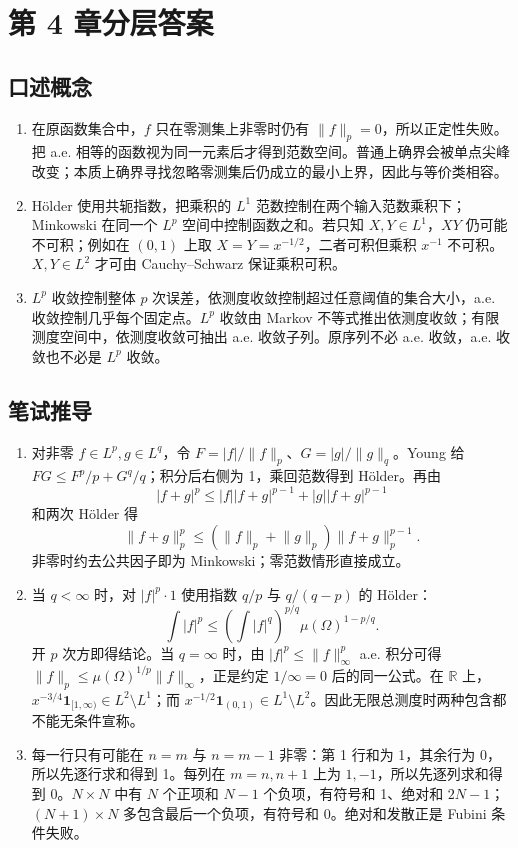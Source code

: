 \chapter{第 4 章分层答案}
\label{app:ch04-solutions}

\section*{口述概念}

\begin{enumerate}[leftmargin=*]
  \item 在原函数集合中，$f$ 只在零测集上非零时仍有 $\lVert f\rVert_p=0$，所以正定性失败。把 a.e. 相等的函数视为同一元素后才得到范数空间。普通上确界会被单点尖峰改变；本质上确界寻找忽略零测集后仍成立的最小上界，因此与等价类相容。
  \item Hölder 使用共轭指数，把乘积的 $L^1$ 范数控制在两个输入范数乘积下；Minkowski 在同一个 $L^p$ 空间中控制函数之和。若只知 $X,Y\in L^1$，$XY$ 仍可能不可积；例如在 $(0,1)$ 上取 $X=Y=x^{-1/2}$，二者可积但乘积 $x^{-1}$ 不可积。$X,Y\in L^2$ 才可由 Cauchy--Schwarz 保证乘积可积。
  \item $L^p$ 收敛控制整体 $p$ 次误差，依测度收敛控制超过任意阈值的集合大小，a.e. 收敛控制几乎每个固定点。$L^p$ 收敛由 Markov 不等式推出依测度收敛；有限测度空间中，依测度收敛可抽出 a.e. 收敛子列。原序列不必 a.e. 收敛，a.e. 收敛也不必是 $L^p$ 收敛。
\end{enumerate}

\section*{笔试推导}

\begin{enumerate}[leftmargin=*]
  \item 对非零 $f\in L^p,g\in L^q$，令 $F=|f|/\lVert f\rVert_p$、$G=|g|/\lVert g\rVert_q$。Young 给 $FG\leq F^p/p+G^q/q$；积分后右侧为 1，乘回范数得到 Hölder。再由
  \[
   |f+g|^p\leq|f||f+g|^{p-1}+|g||f+g|^{p-1}
  \]
  和两次 Hölder 得
  \[
   \lVert f+g\rVert_p^p
   \leq(\lVert f\rVert_p+\lVert g\rVert_p)
        \lVert f+g\rVert_p^{p-1}.
  \]
  非零时约去公共因子即为 Minkowski；零范数情形直接成立。
  \item 当 $q<\infty$ 时，对 $|f|^p\cdot1$ 使用指数 $q/p$ 与 $q/(q-p)$ 的 Hölder：
  \[
   \int|f|^p\leq(\int|f|^q)^{p/q}\mu(\Omega)^{1-p/q}.
  \]
  开 $p$ 次方即得结论。当 $q=\infty$ 时，由 $|f|^p\leq\lVert f\rVert_\infty^p$ a.e. 积分可得 $\lVert f\rVert_p\leq\mu(\Omega)^{1/p}\lVert f\rVert_\infty$，正是约定 $1/\infty=0$ 后的同一公式。在 $\mathbb R$ 上，$x^{-3/4}\mathbf1_{[1,\infty)}\in L^2\setminus L^1$；而 $x^{-1/2}\mathbf1_{(0,1)}\in L^1\setminus L^2$。因此无限总测度时两种包含都不能无条件宣称。
  \item 每一行只有可能在 $n=m$ 与 $n=m-1$ 非零：第 1 行和为 1，其余行为 0，所以先逐行求和得到 1。每列在 $m=n,n+1$ 上为 $1,-1$，所以先逐列求和得到 0。$N\times N$ 中有 $N$ 个正项和 $N-1$ 个负项，有符号和 1、绝对和 $2N-1$；$(N+1)\times N$ 多包含最后一个负项，有符号和 0。绝对和发散正是 Fubini 条件失败。
\end{enumerate}

